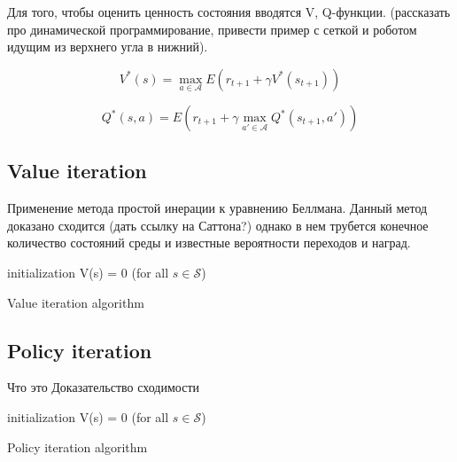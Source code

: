 Для того, чтобы оценить ценность состояния вводятся V, Q-функции. (рассказать про динамической программирование, привести пример с сеткой и роботом идущим из верхнего угла в нижний). 

\begin{equation}
	V^*(s) = \max_{a \in \mathcal{A}} E(r_{t + 1} + \gamma V^*(s_{t + 1}))
\end{equation}

\begin{equation}
Q^*(s, a) = E(r_{t + 1} + \gamma \max_{a' \in \mathcal{A}} Q^*(s_{t + 1}, a'))
\end{equation}
 
\subsection{Value iteration}

Применение метода простой инерации к уравнению Беллмана. Данный метод доказано сходится (дать ссылку на Саттона?) однако в нем трубется конечное количество состояний среды и известные вероятности переходов и наград. 

\begin{algorithm}[H]
	\SetAlgoLined
	initialization V(s) = 0 (for all $s \in \mathcal{S}$)\;
	\caption{Value iteration algorithm}

\end{algorithm}

\subsection{Policy iteration}
Что это 
Доказательство сходимости

\begin{algorithm}[H]
	\SetAlgoLined
	initialization V(s) = 0 (for all $s \in \mathcal{S}$)\;
	\caption{Policy iteration algorithm}
\end{algorithm}

